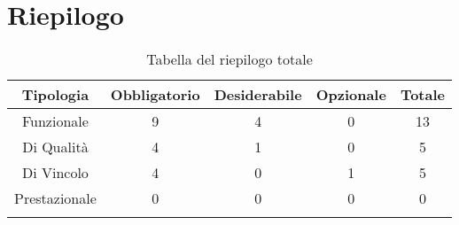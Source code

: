 \section{Riepilogo}

\begin{center}
  \centering
  \begin{longtable}{|c|c|c|c|c|}
    \hline
    \rowcolor[HTML]{036400}
    {\color[HTML]{FFFFFF} \textbf{Tipologia}} & {\color[HTML]{FFFFFF} \textbf{Obbligatorio}} & {\color[HTML]{FFFFFF} \textbf{Desiderabile}} & {\color[HTML]{FFFFFF} \textbf{Opzionale}}  & {\color[HTML]{FFFFFF} \textbf{Totale}} \\ \hline
    \rowcolor[HTML]{EFEFEF}
    Funzionale & 9 & 4 & 0 & 13 \\ \hline
    \rowcolor[HTML]{C0C0C0}
    Di Qualità & 4 & 1 & 0 & 5 \\ \hline
    \rowcolor[HTML]{EFEFEF}
    Di Vincolo & 4 & 0 & 1 & 5 \\ \hline
    \rowcolor[HTML]{C0C0C0}
    Prestazionale & 0 & 0 & 0 & 0 \\ \hline

    \caption{Tabella del riepilogo totale}
  \end{longtable}
\end{center}
